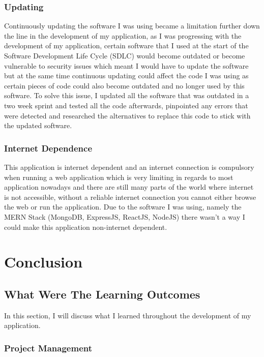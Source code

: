 \subsection{Updating}

Continuously updating the software I was using became a limitation further down the line in the development of my application, as I was progressing with the development of my application, certain software that I used at the start of the Software Development Life Cycle (SDLC) would become outdated or become vulnerable to security issues which meant I would have to update the software but at the same time continuous updating could affect the code I was using as certain pieces of code could also become outdated and no longer used by this software. To solve this issue, I updated all the software that was outdated in a two week sprint and tested all the code afterwards, pinpointed any errors that were detected and researched the alternatives to replace this code to stick with the updated software.

\subsection{Internet Dependence}

This application is internet dependent and an internet connection is compulsory when running a web application which is very limiting in regards to most application nowadays and there are still many parts of the world where internet is not accessible, without a reliable internet connection you cannot either browse the web or run the application. Due to the software I was using, namely the MERN Stack (MongoDB, ExpressJS, ReactJS, NodeJS) there wasn't a way I could make this application non-internet dependent. 

\chapter{Conclusion}

\section{What Were The Learning Outcomes}

In this section, I will discuss what I learned throughout the development of my application.

\subsection{Project Management}

